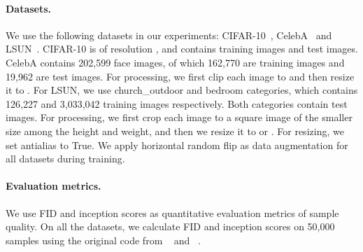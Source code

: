 \documentclass{article} \usepackage{iclr2021_conference,times}
\begin{document}
\paragraph{Datasets.} We use the following datasets in our experiments: CIFAR-10~\citep{krizhevsky2009learning}, CelebA~\citep{liu2015faceattributes} and LSUN~\citep{yu2015lsun}. CIFAR-10 is of resolution , and contains  training images and  test images. CelebA contains 202,599 face images, of which 162,770 are training images and 19,962 are test images. For processing, we first clip each image to  and then resize it to . For LSUN, we use church\_outdoor and bedroom categories, which contains 126,227 and 3,033,042 training images respectively. Both categories contain  test images. For processing, we first crop each image to a square image of the smaller size among the height and weight, and then we resize it to  or . For resizing, we set antialias to True. We apply horizontal random flip as data augmentation for all datasets during training. 

\paragraph{Evaluation metrics.} We use FID and inception scores as quantitative evaluation metrics of sample quality. On all the datasets, we calculate FID and inception scores on 50,000 samples using the original code from ~\citet{salimans2016improved} and ~\citet{heusel2017gans}. 
\end{document}
